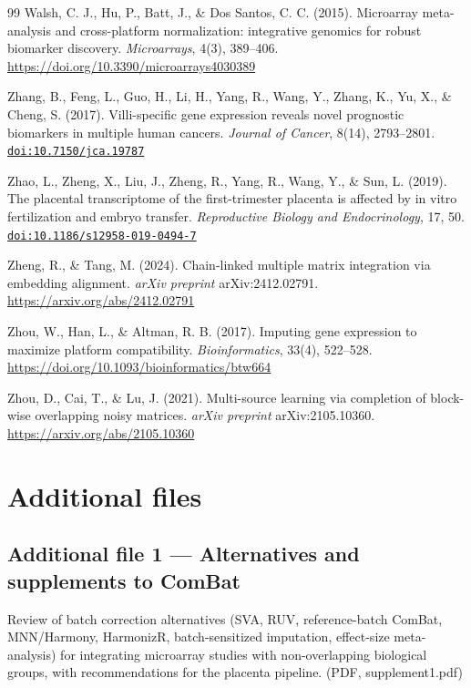 \documentclass[11pt,a4paper]{article}
\newcommand{\doi}[1]{\href{https://doi.org/#1}{\texttt{doi:#1}}}
\begin{document}
\begin{thebibliography}{99}
Walsh, C. J., Hu, P., Batt, J., \& Dos Santos, C. C. (2015).
Microarray meta-analysis and cross-platform normalization:
integrative genomics for robust biomarker discovery.
\emph{Microarrays}, 4(3), 389--406.
\url{https://doi.org/10.3390/microarrays4030389}

Zhang, B., Feng, L., Guo, H., Li, H., Yang, R., Wang, Y.,
Zhang, K., Yu, X., \& Cheng, S. (2017). Villi-specific gene
expression reveals novel prognostic biomarkers in multiple human
cancers. \emph{Journal of Cancer}, 8(14), 2793--2801.
\doi{10.7150/jca.19787}

Zhao, L., Zheng, X., Liu, J., Zheng, R., Yang, R., Wang, Y.,
\& Sun, L. (2019). The placental transcriptome of the
first-trimester placenta is affected by in vitro fertilization
and embryo transfer. \emph{Reproductive Biology and
Endocrinology}, 17, 50.
\doi{10.1186/s12958-019-0494-7}

Zheng, R., \& Tang, M. (2024). Chain-linked multiple matrix
integration via embedding alignment. \emph{arXiv preprint}
arXiv:2412.02791.
\url{https://arxiv.org/abs/2412.02791}

Zhou, W., Han, L., \& Altman, R. B. (2017). Imputing gene
expression to maximize platform compatibility.
\emph{Bioinformatics}, 33(4), 522--528.
\url{https://doi.org/10.1093/bioinformatics/btw664}

Zhou, D., Cai, T., \& Lu, J. (2021). Multi-source learning via
completion of block-wise overlapping noisy matrices.
\emph{arXiv preprint} arXiv:2105.10360.
\url{https://arxiv.org/abs/2105.10360}

\end{thebibliography}


\section*{Additional files}

\subsection*{Additional file 1 --- Alternatives and supplements to ComBat}
Review of batch correction alternatives (SVA, RUV, reference-batch ComBat,
MNN/Harmony, HarmonizR, batch-sensitized imputation, effect-size
meta-analysis) for integrating microarray studies with non-overlapping
biological groups, with recommendations for the placenta pipeline.
(PDF, supplement1.pdf)
\end{document}
